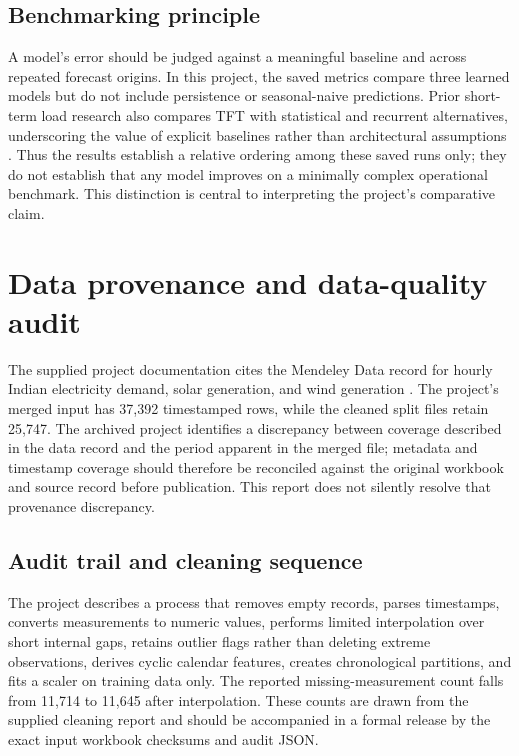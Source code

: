 \documentclass[12pt,a4paper]{article}
\begin{document}
\subsection{Benchmarking principle}
A model's error should be judged against a meaningful baseline and across repeated forecast origins. In this project, the saved metrics compare three learned models but do not include persistence or seasonal-naive predictions. Prior short-term load research also compares TFT with statistical and recurrent alternatives, underscoring the value of explicit baselines rather than architectural assumptions \cite{pham2022}. Thus the results establish a relative ordering among these saved runs only; they do not establish that any model improves on a minimally complex operational benchmark. This distinction is central to interpreting the project's comparative claim.

\newpage
\section{Data provenance and data-quality audit}
The supplied project documentation cites the Mendeley Data record for hourly Indian electricity demand, solar generation, and wind generation \cite{dataset}. The project's merged input has 37,392 timestamped rows, while the cleaned split files retain 25,747. The archived project identifies a discrepancy between coverage described in the data record and the period apparent in the merged file; metadata and timestamp coverage should therefore be reconciled against the original workbook and source record before publication. This report does not silently resolve that provenance discrepancy.

\subsection{Audit trail and cleaning sequence}
The project describes a process that removes empty records, parses timestamps, converts measurements to numeric values, performs limited interpolation over short internal gaps, retains outlier flags rather than deleting extreme observations, derives cyclic calendar features, creates chronological partitions, and fits a scaler on training data only. The reported missing-measurement count falls from 11,714 to 11,645 after interpolation. These counts are drawn from the supplied cleaning report and should be accompanied in a formal release by the exact input workbook checksums and audit JSON.
\end{document}
